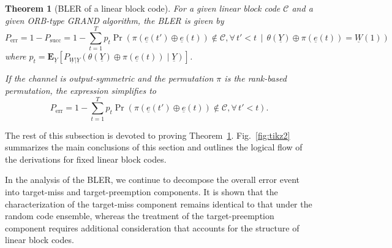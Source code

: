 \documentclass[letterpaper,draftclsnofoot,onecolumn]{IEEEtran}
\newtheorem{theorem}{Theorem}%
\begin{document}
\begin{theorem}[BLER of a linear block code]\label{th:linear_error_rate}
    For a given linear block code $\mathcal{C}$ and a given ORB-type GRAND algorithm, the BLER is given by
    \begin{equation}\label{eq:err_linear}
        P_{\text{err}} = 1 - P_{\text{succ}} =  1 - \sum_{t=1}^{T} p_t \Pr\!\left( \pi(\underline{e}(t') \oplus \underline{e}(t)) \notin \mathcal{C}, \forall\, t' < t \,\middle|\, \theta(\underline{Y})\oplus \pi(\underline{e}(t))=\underline{W}(1) \right)
    \end{equation}
    where $p_t = \mathbf{E}_{\underline{Y}} \left[P_{\underline{W}|\underline{Y}}(\theta(\underline{Y})\oplus \pi(\underline{e}(t))\mid\underline{Y})\right]$.
    
    If the channel is output-symmetric and the permutation $\pi$ is the rank-based permutation, the expression simplifies to
    \begin{equation}\label{eq:err_linear_pi}
        P_{\text{err}} = 1 - \sum_{t=1}^{T}p_t\Pr(\pi(\underline{e}(t') \oplus \underline{e}(t)) \notin \mathcal{C},\forall\, t'< t).
    \end{equation}
\end{theorem}

The rest of this subsection is devoted to proving Theorem~\ref{th:linear_error_rate}. Fig.~\ref{fig:tikz2} summarizes the main conclusions of this section and outlines the logical flow of the derivations for fixed linear block codes.

In the analysis of the BLER, we continue to decompose the overall error event into target-miss and target-preemption components. It is shown that the characterization of the target-miss component remains identical to that under the random code ensemble, whereas the treatment of the target-preemption component requires additional consideration that accounts for the structure of linear block codes.
\end{document}
